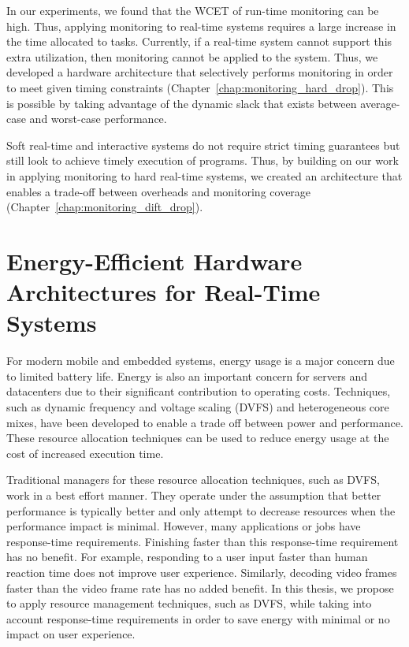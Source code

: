 In our experiments, we found that the WCET of run-time monitoring can be high.
Thus, applying monitoring to real-time systems requires a large increase in the
time allocated to tasks. Currently, if a real-time system cannot support this
extra utilization, then monitoring cannot be applied to the system.  Thus, we
developed a hardware architecture that selectively performs monitoring in order
to meet given timing constraints (Chapter~\ref{chap:monitoring_hard_drop}).
This is possible by taking advantage of the dynamic slack that exists between
average-case and worst-case performance.

Soft real-time and interactive systems do not require strict timing guarantees
but still look to achieve timely execution of programs. Thus, by building on
our work in applying monitoring to hard real-time systems, we created an
architecture that enables a trade-off between overheads and monitoring coverage
(Chapter~\ref{chap:monitoring_dift_drop}). 

\section{Energy-Efficient Hardware Architectures for Real-Time Systems}
\label{sec:intro.energy}

For modern mobile and embedded systems, energy usage is a major concern due to
limited battery life. Energy is also an important concern for servers and
datacenters due to their significant contribution to operating costs.
Techniques, such as dynamic frequency and voltage scaling (DVFS) and
heterogeneous core mixes, have been developed to enable a trade off between
power and performance. These resource allocation techniques can be used to
reduce energy usage at the cost of increased execution time.

Traditional managers for these resource allocation techniques, such as DVFS,
work in a best effort manner. They operate under the assumption that better
performance is typically better and only attempt to decrease resources when the
performance impact is minimal.  However, many applications or jobs have
response-time requirements.  Finishing faster than this response-time
requirement has no benefit. For example, responding to a user input faster than
human reaction time does not improve user experience. Similarly, decoding video
frames faster than the video frame rate has no added benefit. In this thesis,
we propose to apply resource management techniques, such as DVFS, while taking
into account response-time requirements in order to save energy with minimal or
no impact on user experience.

